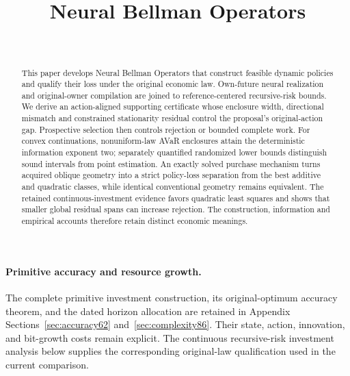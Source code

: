 \documentclass[ecta,nameyear,draft]{econsocart}
\begin{document}
\begin{frontmatter}
\title{Neural Bellman Operators}
\begin{aug}
\author[id=au1,addressref={add1}]{~}
\address[id=add1]{Peking University}
\end{aug}
\begin{abstract}
This paper develops Neural Bellman Operators that construct feasible dynamic policies and qualify their loss under the original economic law. Own-future neural realization and original-owner compilation are joined to reference-centered recursive-risk bounds. We derive an action-aligned supporting certificate whose enclosure width, directional mismatch and constrained stationarity residual control the proposal's original-action gap. Prospective selection then controls rejection or bounded complete work. For convex continuations, nonuniform-law AVaR enclosures attain the deterministic information exponent two; separately quantified randomized lower bounds distinguish sound intervals from point estimation. An exactly solved purchase mechanism turns acquired oblique geometry into a strict policy-loss separation from the best additive and quadratic classes, while identical conventional geometry remains equivalent. The retained continuous-investment evidence favors quadratic least squares and shows that smaller global residual spans can increase rejection. The construction, information and empirical accounts therefore retain distinct economic meanings.
\end{abstract}
\begin{keyword}
\end{keyword}
\end{frontmatter}


\paragraph{Primitive accuracy and resource growth.}
The complete primitive investment construction, its original-optimum accuracy theorem, and the dated horizon allocation are retained in Appendix Sections~\ref{sec:accuracy62} and~\ref{sec:complexity86}. Their state, action, innovation, and bit-growth costs remain explicit. The continuous recursive-risk investment analysis below supplies the corresponding original-law qualification used in the current comparison.















\end{document}

